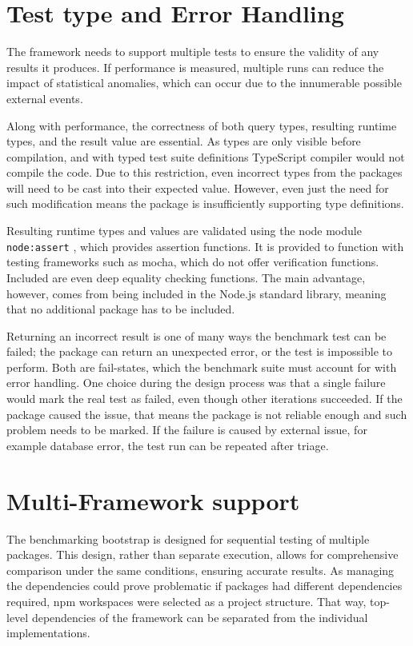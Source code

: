 \section{Test type and Error Handling}

The framework needs to support multiple tests to ensure the validity of any
results it produces. If performance is measured, multiple runs can reduce the
impact of statistical anomalies, which can occur due to the innumerable possible
external events.

Along with performance, the correctness of both query types, resulting runtime
types, and the result value are essential. As types are only visible before
compilation, and with typed test suite definitions TypeScript compiler would not
compile the code. Due to this restriction, even incorrect types from the
packages will need to be cast into their expected value. However, even just the
need for such modification means the package is insufficiently supporting type
definitions.

Resulting runtime types and values are validated using the node module
\texttt{node:assert} \cite{NodeAssert}, which provides assertion functions. It
is provided to function with testing frameworks such as mocha, which do not
offer verification functions. Included are even deep equality checking
functions. The main advantage, however, comes from being included in the Node.js
standard library, meaning that no additional package has to be included.

Returning an incorrect result is one of many ways the benchmark test can be
failed; the package can return an unexpected error, or the test is impossible to
perform. Both are fail-states, which the benchmark suite must account for with
error handling. One choice during the design process was that a single failure
would mark the real test as failed, even though other iterations succeeded. If
the package caused the issue, that means the package is not reliable enough and
such problem needs to be marked. If the failure is caused by external issue, for
example database error, the test run can be repeated after triage.

\section{Multi-Framework support}

The benchmarking bootstrap is designed for sequential testing of multiple
packages. This design, rather than separate execution, allows for comprehensive
comparison under the same conditions, ensuring accurate results. As managing the
dependencies could prove problematic if packages had different dependencies
required, npm workspaces \cite{npmWorkspaces} were selected as a project
structure. That way, top-level dependencies of the framework can be separated
from the individual implementations.

